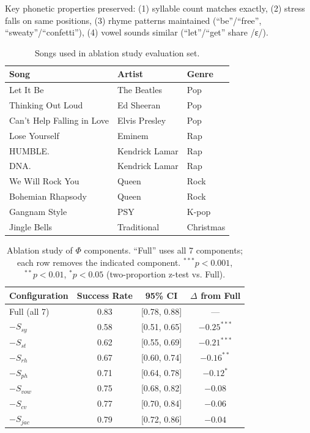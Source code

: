 Key phonetic properties preserved: (1) syllable count matches exactly, (2) stress falls on same positions, (3) rhyme patterns maintained (``be''/``free'', ``sweaty''/``confetti''), (4) vowel sounds similar (``let''/``get'' share /ɛ/).

\begin{table}[h]
\centering
\caption{Songs used in ablation study evaluation set.}
\label{tab:songs}
\begin{tabular}{lll}
\toprule
\textbf{Song} & \textbf{Artist} & \textbf{Genre} \\
\midrule
Let It Be & The Beatles & Pop \\
Thinking Out Loud & Ed Sheeran & Pop \\
Can't Help Falling in Love & Elvis Presley & Pop \\
Lose Yourself & Eminem & Rap \\
HUMBLE. & Kendrick Lamar & Rap \\
DNA. & Kendrick Lamar & Rap \\
We Will Rock You & Queen & Rock \\
Bohemian Rhapsody & Queen & Rock \\
Gangnam Style & PSY & K-pop \\
Jingle Bells & Traditional & Christmas \\
\bottomrule
\end{tabular}
\end{table}

\begin{table}[h]
\centering
\caption{Ablation study of $\Phi$ components. ``Full'' uses all 7 components; each row removes the indicated component. $^{***}p < 0.001$, $^{**}p < 0.01$, $^{*}p < 0.05$ (two-proportion z-test vs. Full).}
\label{tab:ablation}
\begin{tabular}{lccc}
\toprule
\textbf{Configuration} & \textbf{Success Rate} & \textbf{95\% CI} & \textbf{$\Delta$ from Full} \\
\midrule
Full (all 7)    & 0.83 & [0.78, 0.88] & --- \\
$-S_{sy}$       & 0.58 & [0.51, 0.65] & $-0.25^{***}$ \\
$-S_{st}$       & 0.62 & [0.55, 0.69] & $-0.21^{***}$ \\
$-S_{rh}$       & 0.67 & [0.60, 0.74] & $-0.16^{**}$ \\
$-S_{ph}$       & 0.71 & [0.64, 0.78] & $-0.12^{*}$ \\
$-S_{vow}$      & 0.75 & [0.68, 0.82] & $-0.08$ \\
$-S_{cv}$       & 0.77 & [0.70, 0.84] & $-0.06$ \\
$-S_{jac}$      & 0.79 & [0.72, 0.86] & $-0.04$ \\
\bottomrule
\end{tabular}
\end{table}

